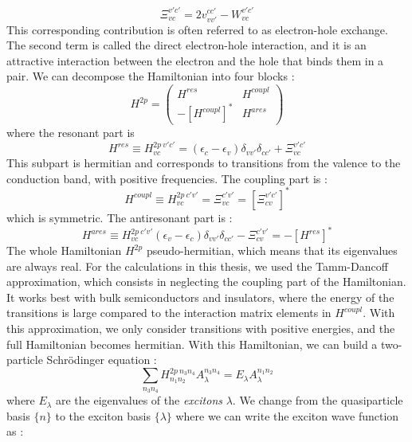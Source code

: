 \begin{equation}
	\Xi^{v'c'}_{vc} = 2v^{cc'}_{vv'} - W^{v'c'}_{vc}
\end{equation}
This corresponding contribution is often referred to as electron-hole exchange. The second term is called the direct electron-hole interaction, and it is an attractive interaction between the electron and the hole that binds them in a pair.
We can decompose the Hamiltonian into four blocks :
\begin{equation}
	H^{2p} = \begin{pmatrix}
		H^{res} & H^{coupl} \\
		-[H^{coupl}]^* & H^{ares}
	\end{pmatrix}
\end{equation}
where the resonant part is 
\begin{equation}
	H^{res} \equiv H^{2p\ v'c'}_{vc} = (\epsilon_c - \epsilon_v) \delta_{vv'}\delta_{cc'} + \Xi^{v'c'}_{vc}
\end{equation}
This subpart is hermitian and corresponds to transitions from the valence to the conduction band, with positive frequencies. The coupling part is :
\begin{equation}
	H^{coupl} \equiv H^{2p\ c'v'}_{vc} = \Xi^{c'v'}_{vc} = [\Xi^{v'c'}_{cv}]^*
\end{equation}
which is symmetric. The antiresonant part is :
\begin{equation}
	H^{ares} \equiv H^{2p\ c'v'}_{vc} (\epsilon_v - \epsilon_c)\delta_{vv'}\delta_{cc'} - \Xi^{c'v'}_{cv} = - [H^{res}]^*
\end{equation}
The whole Hamiltonian $H^{2p}$ pseudo-hermitian, which means that its eigenvalues are always real. For the calculations in this thesis, we used the Tamm-Dancoff approximation, which consists in neglecting the coupling part of the Hamiltonian. It works best with bulk semiconductors and insulators, where the energy of the transitions is large compared to the interaction matrix elements in $H^{coupl}$. \cite{gruning2009exciton} With this approximation, we only consider transitions with positive energies, and the full Hamiltonian becomes hermitian.
With this Hamiltonian, we can build a two-particle Schrödinger equation :
\begin{equation}
	\sum_{n_3n_4} H^{2p\ n_3n_4}_{n_1n_2} A_\lambda^{n_3n_4} = E_\lambda A_\lambda^{n_1n_2}
\end{equation}
where $E_\lambda$ are the eigenvalues of the \textit{excitons} $\lambda$. We change from the quasiparticle basis $\{n\}$ to the exciton basis $\{\lambda\}$ where we can write the exciton wave function as :

